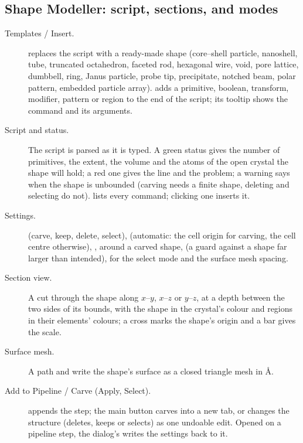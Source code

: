 \subsection{Shape Modeller: script, sections, and modes}
\begin{description}
\item[Templates / Insert.]  replaces the script with a ready-made shape (core--shell particle, nanoshell, tube, truncated octahedron, faceted rod, hexagonal wire, void, pore lattice, dumbbell, ring, Janus particle, probe tip, precipitate, notched beam, polar pattern, embedded particle array).  adds a primitive, boolean, transform, modifier, pattern or region to the end of the script; its tooltip shows the command and its arguments.
\item[Script and status.] The script is parsed as it is typed. A green status gives the number of primitives, the extent, the volume and the atoms of the open crystal the shape will hold; a red one gives the line and the problem; a warning says when the shape is unbounded (carving needs a finite shape, deleting and selecting do not).  lists every command; clicking one inserts it.
\item[Settings.]  (carve, keep, delete, select),  (automatic: the cell origin for carving, the cell centre otherwise), ,  around a carved shape,  (a guard against a shape far larger than intended),  for the select mode and the surface mesh spacing.
\item[Section view.] A cut through the shape along $x$--$y$, $x$--$z$ or $y$--$z$, at a depth between the two sides of its bounds, with the shape in the crystal's colour and regions in their elements' colours; a cross marks the shape's origin and a bar gives the scale.
\item[Surface mesh.] A path and  write the shape's surface as a closed triangle mesh in \AA.
\item[Add to Pipeline / Carve (Apply, Select).]  appends the  step; the main button carves into a new tab, or changes the structure (deletes, keeps or selects) as one undoable edit. Opened on a pipeline step, the dialog's  writes the settings back to it.
\end{description}

